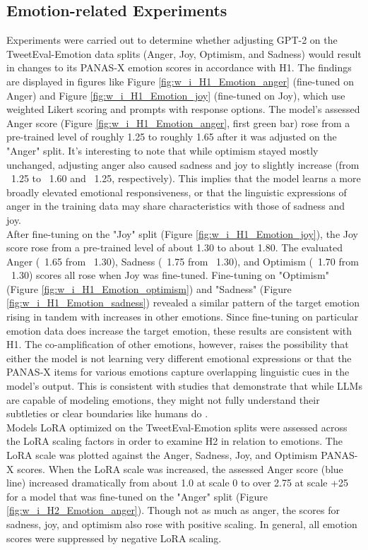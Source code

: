 \documentclass{DESSThesis}
\begin{document}
\subsection{Emotion-related Experiments}
Experiments were carried out to determine whether adjusting GPT-2 on the TweetEval-Emotion data splits (Anger, Joy, Optimism, and Sadness) would result in changes to its PANAS-X emotion scores in accordance with H1. The findings are displayed in figures like Figure \ref{fig:w_i_H1_Emotion_anger} (fine-tuned on Anger) and Figure \ref{fig:w_i_H1_Emotion_joy} (fine-tuned on Joy), which use weighted Likert scoring and prompts with response options. The model's assessed Anger score (Figure \ref{fig:w_i_H1_Emotion_anger}, first green bar) rose from a pre-trained level of roughly 1.25 to roughly 1.65 after it was adjusted on the "Anger" split. It's interesting to note that while optimism stayed mostly unchanged, adjusting anger also caused sadness and joy to slightly increase (from ~1.25 to ~1.60 and ~1.25, respectively). This implies that the model learns a more broadly elevated emotional responsiveness, or that the linguistic expressions of anger in the training data may share characteristics with those of sadness and joy.
\\
After fine-tuning on the "Joy" split (Figure \ref{fig:w_i_H1_Emotion_joy}), the Joy score rose from a pre-trained level of about 1.30 to about 1.80. The evaluated Anger (~1.65 from ~1.30), Sadness (~1.75 from ~1.30), and Optimism (~1.70 from ~1.30) scores all rose when Joy was fine-tuned. Fine-tuning on "Optimism" (Figure \ref{fig:w_i_H1_Emotion_optimism}) and "Sadness" (Figure \ref{fig:w_i_H1_Emotion_sadness}) revealed a similar pattern of the target emotion rising in tandem with increases in other emotions. Since fine-tuning on particular emotion data does increase the target emotion, these results are consistent with H1. The co-amplification of other emotions, however, raises the possibility that either the model is not learning very different emotional expressions or that the PANAS-X items for various emotions capture overlapping linguistic cues in the model's output. This is consistent with studies that demonstrate that while LLMs are capable of modeling emotions, they might not fully understand their subtleties or clear boundaries like humans do \cite{chang_modeling_2024, liu_emollms_2024}.
\\
Models LoRA optimized on the TweetEval-Emotion splits were assessed across the LoRA scaling factors in order to examine H2 in relation to emotions. The LoRA scale was plotted against the Anger, Sadness, Joy, and Optimism PANAS-X scores. When the LoRA scale was increased, the assessed Anger score (blue line) increased dramatically from about 1.0 at scale 0 to over 2.75 at scale +25 for a model that was fine-tuned on the "Anger" split (Figure \ref{fig:w_i_H2_Emotion_anger}). Though not as much as anger, the scores for sadness, joy, and optimism also rose with positive scaling. In general, all emotion scores were suppressed by negative LoRA scaling.
\end{document}
